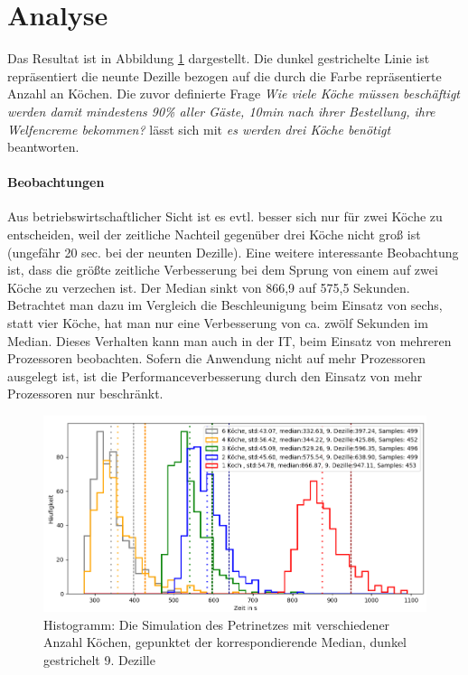 \section*{Analyse} %
\label{sec:analyse}
Das Resultat ist in Abbildung \ref{pic:sim} dargestellt. Die dunkel gestrichelte Linie ist repräsentiert die neunte Dezille bezogen auf die durch die Farbe repräsentierte Anzahl an Köchen. Die zuvor definierte Frage \textit{Wie viele Köche müssen beschäftigt werden damit mindestens 90\% aller Gäste, 10min nach ihrer Bestellung, ihre Welfencreme bekommen?} lässt sich mit \textit{es werden drei Köche benötigt} beantworten.
\paragraph{Beobachtungen}
Aus betriebswirtschaftlicher Sicht ist es evtl. besser sich nur für zwei Köche zu entscheiden, weil der zeitliche Nachteil gegenüber drei Köche nicht groß ist (ungefähr 20 sec. bei der neunten Dezille). Eine weitere interessante Beobachtung ist, dass die größte zeitliche Verbesserung bei dem Sprung von einem auf zwei Köche zu verzechen ist. Der Median sinkt von 866,9 auf 575,5 Sekunden. Betrachtet man dazu im Vergleich die Beschleunigung beim Einsatz von sechs, statt vier Köche, hat man nur eine Verbesserung von ca. zwölf Sekunden im Median.
Dieses Verhalten kann man auch in der IT, beim Einsatz von mehreren Prozessoren beobachten. Sofern die Anwendung nicht auf mehr Prozessoren ausgelegt ist, ist die Performanceverbesserung durch den Einsatz von mehr Prozessoren nur beschränkt. 


\begin{figure}[ht]
  \includegraphics[width=1\textwidth]{pics/sim.png}
  \caption{Histogramm: Die Simulation des Petrinetzes mit verschiedener Anzahl Köchen, gepunktet der korrespondierende Median, dunkel gestrichelt 9. Dezille}
  \label{pic:sim}
\end{figure}




